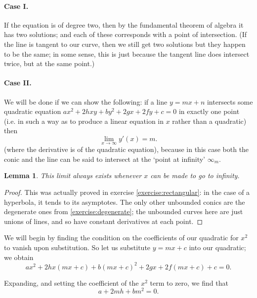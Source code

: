 \documentclass[a4paper,leqno,10pt]{article}
\theoremstyle{exercise}
\theoremstyle{plain}
\newtheorem*{lem}{Lemma}
\theoremstyle{definition}
\theoremstyle{remark}
\begin{document}
\paragraph{Case I.} If the equation is of degree two, then by the fundamental theorem of algebra it
has two solutions; and each of these corresponds with a point of intersection. (If the line is tangent
to our curve, then we still get two solutions but they happen to be the same; in some sense, this is
just because the tangent line does intersect twice, but at the same point.)

\paragraph{Case II.} We will be done if we can show the following: if a line $ y = mx + n $ intersects
some quadratic equation $ ax^2 + 2hxy + by^2 + 2gx + 2fy + c = 0 $ in exactly one point (i.e. in such a
way as to produce a linear equation in $ x $ rather than a quadratic) then
\begin{equation}
  \lim_{x \to \infty} y'(x) = m.
\end{equation}
(where the derivative is of the quadratic equation), because in this case both the conic
and the line can be said to intersect at the `point at infinity' $ \infty_m $.

\begin{lem}
  This limit always exists whenever $ x $ can be made to go to infinity.
\end{lem}
\begin{proof}
  This was actually proved in exercise \ref{exercise:rectangular}: in the case of a hyperbola, it tends
  to its asymptotes. The only other unbounded conics are the degenerate ones from \ref{exercise:degenerate};
  the unbounded curves here are just unions of lines, and so have constant derivatives at each point.
\end{proof}

We will begin by finding the condition on the coefficients of our quadratic for $ x^2 $ to vanish upon substitution.
So let us substitute $ y = mx + c $ into our quadratic; we obtain
\begin{displaymath}
  ax^2 + 2hx(mx + c) + b(mx + c)^2 + 2gx + 2f(mx + c) + c = 0.
\end{displaymath}

Expanding, and setting the coefficient of the $ x^2 $ term to zero, we find that
\begin{displaymath}
  a + 2mh + bm^2 = 0.
\end{displaymath}
\end{document}
